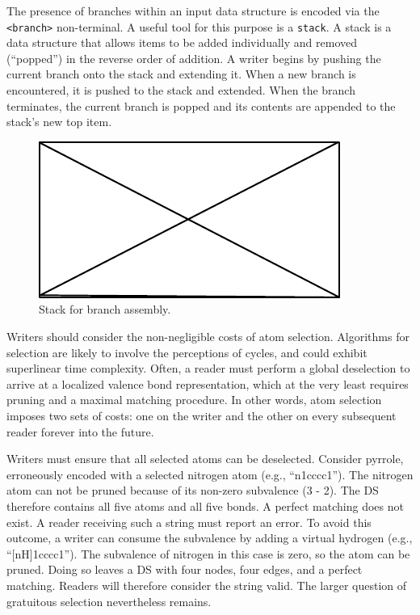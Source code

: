 \documentclass{article}
\def\ttt{\texttt}
\begin{document}
The presence of branches within an input data structure is encoded via the \ttt{<branch>} non-terminal. A useful tool for this purpose is a \ttt{stack}. A stack is a data structure that allows items to be added individually and removed (\enquote{popped}) in the reverse order of addition. A writer begins by pushing the current branch onto the stack and extending it. When a new branch is encountered, it is pushed to the stack and extended. When the branch terminates, the current branch is popped and its contents are appended to the stack's new top item.

\begin{figure}
    \centering
    \includegraphics{filler}
    \caption{Stack for branch assembly.}
    \label{fig:branch-stack}
\end{figure}

Writers should consider the non-negligible costs of atom selection. Algorithms for selection are likely to involve the perceptions of cycles, and could exhibit superlinear time complexity. Often, a reader must perform a global deselection to arrive at a localized valence bond representation, which at the very least requires pruning and a maximal matching procedure. In other words, atom selection imposes two sets of costs: one on the writer and the other on every subsequent reader forever into the future.

Writers must ensure that all selected atoms can be deselected. Consider pyrrole, erroneously encoded with a selected nitrogen atom (e.g., \enquote{n1cccc1}). The nitrogen atom can not be pruned because of its non-zero subvalence (3 - 2). The DS therefore contains all five atoms and all five bonds. A perfect matching does not exist. A reader receiving such a string must report an error. To avoid this outcome, a writer can consume the subvalence by adding a virtual hydrogen (e.g., \enquote{[nH]1cccc1}). The subvalence of nitrogen in this case is zero, so the atom can be pruned. Doing so leaves a DS with four nodes, four edges, and a perfect matching. Readers will therefore consider the string valid. The larger question of gratuitous selection nevertheless remains.
\end{document}
